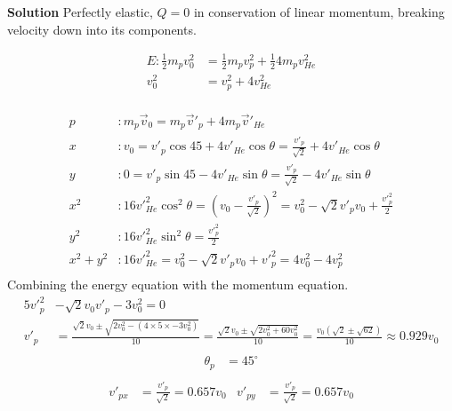 \documentclass[]{article}
\newcommand{\bd}{\textbf}
\begin{document}
	\bd{Solution} Perfectly elastic, $Q = 0$ in conservation of linear momentum, breaking velocity down into its components.

	\begin{equation}
		\begin{split}
			E: \frac{1}{2}m_p v^2_0 &= \frac{1}{2}m_p v^2_p + \frac{1}{2}4m_p v^2_{He} \\
			v^2_0 &= v^2_p + 4v^2_{He} \\
		\end{split}
	\end{equation}

	\begin{equation}
		\begin{split}
			p&: m_p\vec{v}_0 = m_p\vec{v}'_p + 4m_p\vec{v}'_{He} \\
			x&: v_0 = v'_p \cos 45 + 4v'_{He} \cos \theta = \frac{v'_p}{\sqrt{2}} + 4v'_{He} \cos \theta \\
			y&: 0 = v'_p \sin 45 - 4v'_{He} \sin \theta = \frac{v'_p}{\sqrt{2}} - 4v'_{He} \sin \theta \\
			x^2&: 16v'^2_{He} \cos^2 \theta = \left( v_0 - \frac{v'_p}{\sqrt{2}} \right)^2 = v^2_0 - \sqrt{2}v'_p v_0 + \frac{v'^2_p}{2} \\
			y^2&: 16v'^2_{He} \sin^2 \theta = \frac{v'^2_p}{2} \\
			x^2 + y^2 &: 16v'^2_{He} = v^2_0 - \sqrt{2}v'_p v_0 + v'^2_p = 4v^2_0 - 4v^2_p \\
		\end{split}
	\end{equation}
	Combining the energy equation with the momentum equation.
	\begin{equation}
		\begin{split}
			5v'^2_p &- \sqrt{2}v_0 v'_p - 3v^2_0 = 0 \\
			v'_p &= \frac{\sqrt{2}v_0 \pm \sqrt{2v^2_0 - (4 \times 5 \times -3v^2_0)}}{10} = \frac{\sqrt{2}v_0 \pm \sqrt{2v^2_0 + 60 v^2_0}}{10} = \frac{v_0 (\sqrt{2} \pm \sqrt{62})}{10} \approx 0.929 v_0 \\
		\end{split}
	\end{equation}
	\begin{equation}
		\begin{split}
			\theta_p &= 45^{\circ} \\
		\end{split}
	\end{equation}
	\begin{equation}
		\begin{aligned}
			v'_{px} &= \frac{v'_p}{\sqrt{2}} = 0.657v_0 & v'_{py} &= \frac{v'_p}{\sqrt{2}} = 0.657v_0 \\
		\end{aligned}
	\end{equation}
\end{document}
